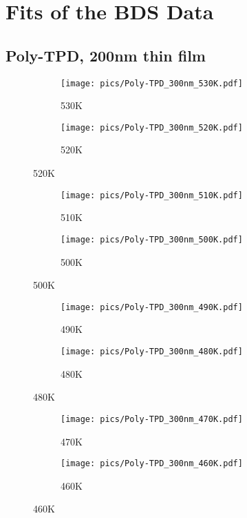 \chapter{Fits of the BDS Data}
\section{Poly-TPD, 200nm thin film}
\begin{figure}[!htb]
\centering
\begin{subfigure}[t]{.5\textwidth}
  \centering
  \texttt{[image: pics/Poly-TPD\_300nm\_530K.pdf]}
  \caption{530K}
  \label{fig:sub1}
\end{subfigure}%
\begin{subfigure}[t]{.5\textwidth}
  \centering
  \texttt{[image: pics/Poly-TPD\_300nm\_520K.pdf]}
  \caption{520K}
  \label{fig:sub2}
\end{subfigure}
  \label{14bis}
\end{figure}

\begin{figure}[!htb]
\centering
\begin{subfigure}[t]{.5\textwidth}
  \centering
  \texttt{[image: pics/Poly-TPD\_300nm\_510K.pdf]}
  \caption{510K}
  \label{fig:sub1}
\end{subfigure}%
\begin{subfigure}[t]{.5\textwidth}
  \centering
  \texttt{[image: pics/Poly-TPD\_300nm\_500K.pdf]}
  \caption{500K}
  \label{fig:sub2}
\end{subfigure}
  \label{14bis}
\end{figure}

\begin{figure}[!htb]
\centering
\begin{subfigure}[t]{.5\textwidth}
  \centering
  \texttt{[image: pics/Poly-TPD\_300nm\_490K.pdf]}
  \caption{490K}
  \label{fig:sub1}
\end{subfigure}%
\begin{subfigure}[t]{.5\textwidth}
  \centering
  \texttt{[image: pics/Poly-TPD\_300nm\_480K.pdf]}
  \caption{480K}
  \label{fig:sub2}
\end{subfigure}
  \label{14bis}
\end{figure}

\begin{figure}[!htb]
\centering
\begin{subfigure}[t]{.5\textwidth}
  \centering
  \texttt{[image: pics/Poly-TPD\_300nm\_470K.pdf]}
  \caption{470K}
  \label{fig:sub1}
\end{subfigure}%
\begin{subfigure}[t]{.5\textwidth}
  \centering
  \texttt{[image: pics/Poly-TPD\_300nm\_460K.pdf]}
  \caption{460K}
  \label{fig:sub2}
\end{subfigure}
  \label{14bis}
\end{figure}

